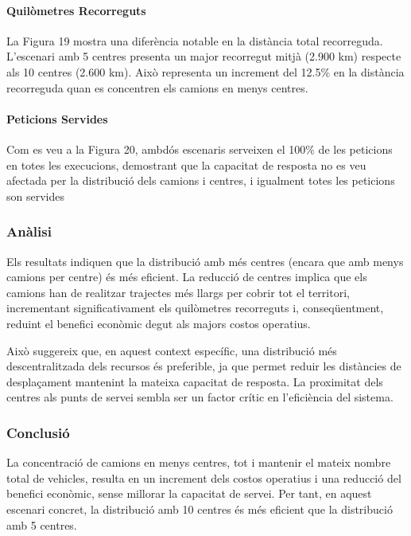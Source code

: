 \paragraph{Quilòmetres Recorreguts}

La Figura 19 mostra una diferència notable en la distància total recorreguda. L'escenari amb 5 centres presenta un major recorregut mitjà (2.900 km) respecte als 10 centres (2.600 km). Això representa un increment del 12.5\% en la distància recorreguda quan es concentren els camions en menys centres.


\paragraph{Peticions Servides}
Com es veu a la Figura 20, ambdós escenaris serveixen el 100\% de les peticions en totes les execucions, demostrant que la capacitat de resposta no es veu afectada per la distribució dels camions i centres, i igualment totes les peticions son servides


\vspace{0.5cm}


\subsubsection{Anàlisi}
Els resultats indiquen que la distribució amb més centres (encara que amb menys camions per centre) és més eficient. La reducció de centres implica que els camions han de realitzar trajectes més llargs per cobrir tot el territori, incrementant significativament els quilòmetres recorreguts i, conseqüentment, reduint el benefici econòmic degut als majors costos operatius.

Això suggereix que, en aquest context específic, una distribució més descentralitzada dels recursos és preferible, ja que permet reduir les distàncies de desplaçament mantenint la mateixa capacitat de resposta. La proximitat dels centres als punts de servei sembla ser un factor crític en l'eficiència del sistema.

\vspace{0.5cm}


\subsubsection{Conclusió}
La concentració de camions en menys centres, tot i mantenir el mateix nombre total de vehicles, resulta en un increment dels costos operatius i una reducció del benefici econòmic, sense millorar la capacitat de servei. Per tant, en aquest escenari concret, la distribució amb 10 centres és més eficient que la distribució amb 5 centres.

